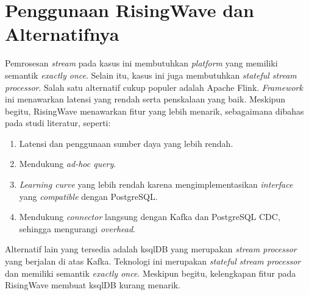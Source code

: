 \section{Penggunaan RisingWave dan Alternatifnya}

Pemrosesan \textit{stream} pada kasus ini membutuhkan \textit{platform} yang memiliki semantik \textit{exactly once}. Selain itu, kasus ini juga membutuhkan \textit{stateful stream processor}. Salah satu alternatif cukup populer adalah Apache Flink. \textit{Framework} ini menawarkan latensi yang rendah serta penskalaan yang baik. Meskipun begitu, RisingWave menawarkan fitur yang lebih menarik, sebagaimana dibahas pada studi literatur, seperti:

\begin{enumerate}
    \item Latensi dan penggunaan sumber daya yang lebih rendah.
    \item Mendukung \textit{ad-hoc query}.
    \item \textit{Learning curve} yang lebih rendah karena mengimplementasikan \textit{interface} yang \textit{compatible} dengan PostgreSQL.
    \item Mendukung \textit{connector} langsung dengan Kafka dan PostgreSQL CDC, sehingga mengurangi \textit{overhead}.
\end{enumerate}

Alternatif lain yang tersedia adalah ksqlDB yang merupakan \textit{stream processor} yang berjalan di atas Kafka. Teknologi ini merupakan \textit{stateful stream processor} dan memiliki semantik \textit{exactly once}. Meskipun begitu, kelengkapan fitur pada RisingWave membuat ksqlDB kurang menarik.